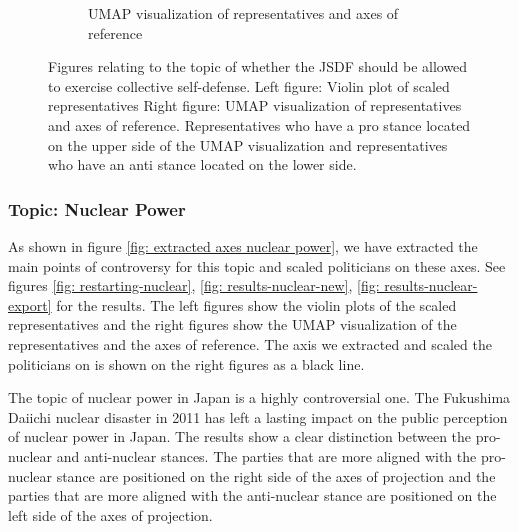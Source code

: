 \documentclass[final,5p,times,twocolumn,authoryear]{elsarticle}
\begin{document}
\begin{figure}[h]
\begin{subfigure}{0.22\textwidth}
      \caption{UMAP visualization of representatives and axes of reference}
    \end{subfigure}
\caption{Figures relating to the topic of whether the JSDF should be allowed to exercise collective self-defense.
Left figure: Violin plot of scaled representatives
Right figure: UMAP visualization of representatives and axes of reference. Representatives who have a pro stance located on the upper side of the UMAP visualization and representatives who have an anti stance located on the lower side.}
\label{fig: results-defence-collective}
\end{figure}

\FloatBarrier
\subsubsection{Topic: Nuclear Power}
As shown in figure \ref{fig: extracted axes nuclear power}, we have extracted the main points of controversy for this topic and scaled politicians on these axes. See figures \ref{fig: restarting-nuclear}, \ref{fig: results-nuclear-new}, \ref{fig: results-nuclear-export} for the results. The left figures show the violin plots of the scaled representatives and the right figures show the UMAP visualization of the representatives and the axes of reference. The axis we extracted and scaled the politicians on is shown on the right figures as a black line. 

The topic of nuclear power in Japan is a highly controversial one. The Fukushima Daiichi nuclear disaster in 2011 has left a lasting impact on the public perception of nuclear power in Japan. The results show a clear distinction between the pro-nuclear and anti-nuclear stances. The parties that are more aligned with the pro-nuclear stance are positioned on the right side of the axes of projection and the parties that are more aligned with the anti-nuclear stance are positioned on the left side of the axes of projection.
\end{document}
